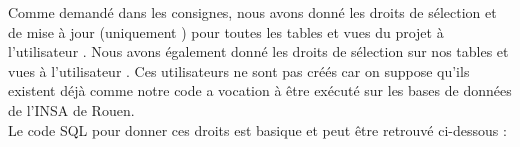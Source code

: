 Comme demandé dans les consignes, nous avons donné les droits de sélection et de mise à jour (uniquement ) pour toutes les tables et vues du projet à l'utilisateur . Nous avons également donné les droits de sélection sur nos tables et vues à l'utilisateur . Ces utilisateurs ne sont pas créés car on suppose qu'ils existent déjà comme notre code a vocation à être exécuté sur les bases de données de l'INSA de Rouen.\\

Le code SQL pour donner ces droits est basique et peut être retrouvé ci-dessous :
\inputminted[tabsize=4,linenos,fontsize=\small]{sql}{code/droits.sql}